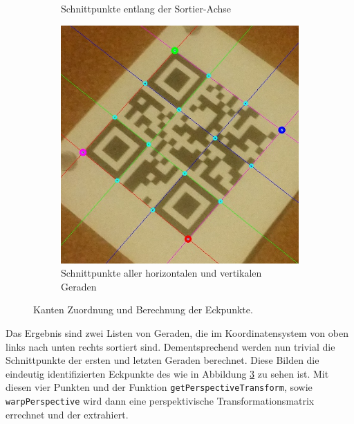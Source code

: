 \begin{figure}[t]
\begin{subfigure}[t]{0.3\textwidth}
\caption{Schnittpunkte entlang der Sortier-Achse}\label{fig:sort}
\end{subfigure}%
\begin{subfigure}[t]{0.3\textwidth}
\centering
\includegraphics[scale=0.25]{images/qrcode-adler-wand_9___INTERSECTIONS___0_.jpg}
\caption{Schnittpunkte aller horizontalen und vertikalen Geraden}\label{fig:corner}
\end{subfigure}
\caption{Kanten Zuordnung und Berechnung der Eckpunkte.}
\end{figure}

Das Ergebnis sind zwei Listen von Geraden, die im \QRCode Koordinatensystem von oben links nach unten rechts sortiert sind. Dementsprechend werden nun trivial die Schnittpunkte der ersten und letzten Geraden berechnet. Diese Bilden die eindeutig identifizierten Eckpunkte des \QRCodes wie in Abbildung \ref{fig:corner} zu sehen ist. Mit diesen vier Punkten und der \OpenCV Funktion  \texttt{getPerspectiveTransform}, sowie \texttt{warpPerspective} wird dann eine perspektivische Transformationsmatrix errechnet und der \QRCode extrahiert.